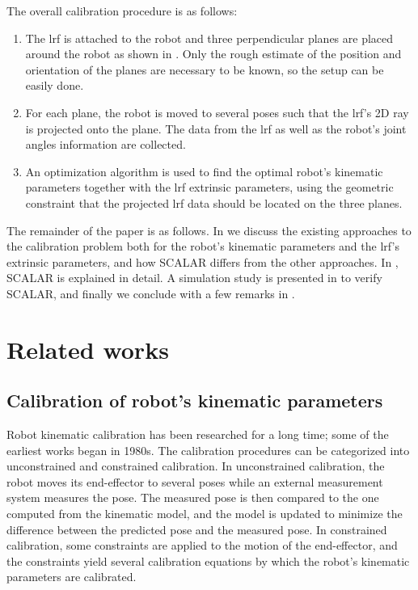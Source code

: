 The overall calibration procedure is as follows:
\begin{enumerate}
\item The \ac{lrf} is attached to the robot and three perpendicular planes are placed around the robot as shown in . Only the rough estimate of the position and orientation of the planes are necessary to be known, so the setup can be easily done.
\item For each plane, the robot is moved to several poses such that the \ac{lrf}'s 2D ray is projected onto the plane. The data from the \ac{lrf} as well as the robot's joint angles information are collected.
\item An optimization algorithm is used to find the optimal robot's kinematic parameters together with the \ac{lrf} extrinsic parameters, using the geometric constraint that the projected \ac{lrf} data should be located on the three planes. 
\end{enumerate}

The remainder of the paper is as follows. In  we discuss the existing approaches to the calibration problem both for the robot's kinematic parameters and the \ac{lrf}'s extrinsic parameters, and how SCALAR differs from the other approaches. In , SCALAR is explained in detail. A simulation study is presented in  to verify SCALAR, and finally we conclude with a few remarks in .  



\section{Related works}
\label{sec:related}
\subsection{Calibration of robot's kinematic parameters}
\label{sec:kine_calib}



Robot kinematic calibration has been researched for a long time; some of the earliest works began in 1980s. The calibration procedures can be categorized into unconstrained and constrained calibration. In unconstrained calibration, the robot moves its end-effector to several poses while an external measurement system measures the pose. The measured pose is then compared to the one computed from the kinematic model, and the model is updated to minimize the difference between the predicted pose and the measured pose. In constrained calibration, some constraints are applied to the motion of the end-effector, and the constraints yield several calibration equations by which the robot's kinematic parameters are calibrated. 


